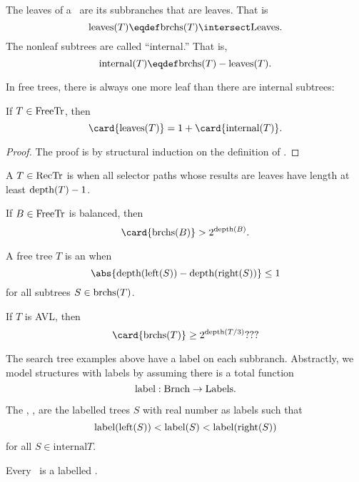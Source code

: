 The leaves of a \brnch\ are its subbranches that are leaves.  That is
\[
\text{leaves}(T) \eqdef \subbrn{T} \intersect \leafset.
\]
The nonleaf subtrees are called ``internal.''  That is,
\[
\text{internal}(T) \eqdef \subbrn{T} - \text{leaves}(T).
\]

In free trees, there is always one more leaf than there are internal
subtrees:

\begin{lemma}\label{}
If $T \in \text{FreeTr}$, then
\[
\card{\text{leaves}(T)} = 1 + \card{\text{internal}(T)}.
\]
\end{lemma}

\begin{proof}
The proof is by structural induction on the definition of \freetr.

\end{proof} 

A $T \in \text{RecTr}$ is  when all selector paths whose
results are leaves have length at least $\text{depth}(T) -1$.

\begin{lemma}\label{}
If $B \in \text{FreeTr}$ is balanced, then
\[
\card{\subbrn{B}} > 2^{\text{depth}(B)}.
\]
\end{lemma}

A free tree $T$ is an  when
\[
\abs{\trdpth{\leftsub{S}} - \trdpth{\rightsub{S}}} \leq 1
\]
for all subtrees $S \in \text{brchs}(T)$.

\begin{lemma}\label{}
If $T$ is AVL, then
\[
\card{\subbrn{T}} \geq 2^{\text{depth}(T/3)}???
\]
\end{lemma}

The search tree examples above have a label on each subbranch.
Abstractly, we model structures with labels by assuming there is a
total function
\[
\text{label}:\text{Brnch} \to \text{Labels}.
\]

\begin{definition}
The , \srchtr, are the labelled trees $S$ with real
number as labels such that
\[
\text{label}(\text{left}(S)) < \text{label}(S) < \text{label}(\text{right}(S))
\]
for all $S \in \text{internal}{T}$.
\end{definition}

\begin{lemma}\label{}
Every \srchtr\ is a labelled \freetr.
\end{lemma}

